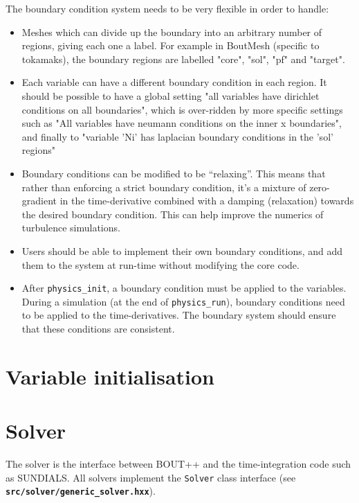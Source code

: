\documentclass[12pt]{article}
\newcommand{\code}[1]{\texttt{#1}}
\newcommand{\file}[1]{\texttt{\bf #1}}
\begin{document}
The boundary condition system needs to be very flexible in order to handle:
\begin{itemize}
\item Meshes which can divide up the boundary into an arbitrary number
  of regions, giving each one a label. For example in BoutMesh 
  (specific to tokamaks), the boundary regions are labelled "core",
  "sol", "pf" and "target".
\item Each variable can have a different boundary condition in each region.
  It should be possible to have a global setting "all variables have dirichlet
  conditions on all boundaries", which is over-ridden by more specific settings
  such as "All variables have neumann conditions on the inner x boundaries", 
  and finally to "variable 'Ni' has laplacian boundary conditions in the
  'sol' regions"
\item Boundary conditions can be modified to be ``relaxing''. This means that
  rather than enforcing a strict boundary condition, it's a mixture of
  zero-gradient in the time-derivative combined with a damping (relaxation)
  towards the desired boundary condition. This can help improve the numerics
  of turbulence simulations.
\item Users should be able to implement their own boundary conditions,
  and add them to the system at run-time without modifying the core code.
\item After \code{physics\_init}, a boundary condition must be applied to
  the variables. During a simulation (at the end of \code{physics\_run}),
  boundary conditions need to be applied to the time-derivatives. The
  boundary system should ensure that these conditions are consistent.
\end{itemize}



\section{Variable initialisation}



\section{Solver}
The solver is the interface between BOUT++ and the time-integration code
such as SUNDIALS. All solvers implement the \code{Solver} class
interface (see \file{src/solver/generic\_solver.hxx}).
\end{document}
